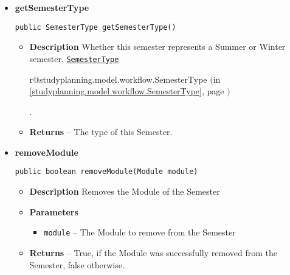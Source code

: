 \documentclass[11pt,a4paper]{report}
\makeatletter
\newcommand{\refdefined}[1]{
\expandafter\ifx\csname r@#1\endcsname\relax
\relax\else
{$($in \ref{#1}, page \pageref{#1}$)$}\fi}
\makeatother
\begin{document}
{{{{{{{{{{{{{{\begin{itemize}
{\begin{lstlisting}[frame=none]
public java.util.Collection getModules()
						\end{lstlisting} %
						\begin{itemize}
							\item{
								{\bf  Description}
								Returns an immutable set of Modules in this Semester.
							}
							\item{
								{\bf  Returns} 
								-- All Modules in this Semester. 
							}%
						\end{itemize}
					}%
					\item{ 
						\hypertarget{studyplanning.model.workflow.Semester.getSemesterType()}{{\bf  getSemesterType}\\}
						\begin{lstlisting}[frame=none]
public SemesterType getSemesterType()
						\end{lstlisting} %
						\begin{itemize}
							\item{
								{\bf  Description}
								Whether this semester represents a Summer or Winter semester. \texttt{\small \hyperlink{studyplanning.model.workflow.SemesterType}{SemesterType}}{\small 
								\refdefined{studyplanning.model.workflow.SemesterType}}.
							}
							\item{
								{\bf  Returns} 
								-- The type of this Semester. 
							}%
						\end{itemize}
					}%
					\item{ 
						\hypertarget{studyplanning.model.workflow.Semester.removeModule(studyplanning.model.workflow.Module)}{{\bf  removeModule}\\}
						\begin{lstlisting}[frame=none]
public boolean removeModule(Module module)
						\end{lstlisting} %
						\begin{itemize}
							\item{
								{\bf  Description}
								Removes the Module of the Semester
							}
							\item{
								{\bf  Parameters}
								\begin{itemize}
									\item{\texttt{module} -- The Module to remove from the Semester}
								\end{itemize}
							}%
							\item{
								{\bf  Returns} 
								-- True, if the Module was successfully removed from the Semester, false otherwise.
							}%
						\end{itemize}
					}%
				\end{itemize}
			}
		}

}}}}}}}}}}}}
\end{document}
